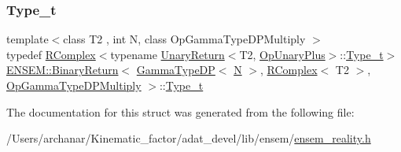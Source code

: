 \subsubsection{\texorpdfstring{Type\_t}{Type\_t}\hspace{0.1cm}{\footnotesize\ttfamily [2/2]}}
{\footnotesize\ttfamily template$<$class T2 , int N, class Op\+Gamma\+Type\+D\+P\+Multiply $>$ \\
typedef \mbox{\hyperlink{classENSEM_1_1RComplex}{R\+Complex}}$<$typename \mbox{\hyperlink{structENSEM_1_1UnaryReturn}{Unary\+Return}}$<$T2, \mbox{\hyperlink{structENSEM_1_1OpUnaryPlus}{Op\+Unary\+Plus}}$>$\+::\mbox{\hyperlink{structENSEM_1_1BinaryReturn_3_01GammaTypeDP_3_01N_01_4_00_01RComplex_3_01T2_01_4_00_01OpGammaTypeDPMultiply_01_4_a7e6760cdc5301aa79d46345dc1f653fe}{Type\+\_\+t}}$>$ \mbox{\hyperlink{structENSEM_1_1BinaryReturn}{E\+N\+S\+E\+M\+::\+Binary\+Return}}$<$ \mbox{\hyperlink{classENSEM_1_1GammaTypeDP}{Gamma\+Type\+DP}}$<$ \mbox{\hyperlink{operator__name__util_8cc_a7722c8ecbb62d99aee7ce68b1752f337}{N}} $>$, \mbox{\hyperlink{classENSEM_1_1RComplex}{R\+Complex}}$<$ T2 $>$, \mbox{\hyperlink{structENSEM_1_1OpGammaTypeDPMultiply}{Op\+Gamma\+Type\+D\+P\+Multiply}} $>$\+::\mbox{\hyperlink{structENSEM_1_1BinaryReturn_3_01GammaTypeDP_3_01N_01_4_00_01RComplex_3_01T2_01_4_00_01OpGammaTypeDPMultiply_01_4_a7e6760cdc5301aa79d46345dc1f653fe}{Type\+\_\+t}}}



The documentation for this struct was generated from the following file\+:\begin{DoxyCompactItemize}
\item 
/\+Users/archanar/\+Kinematic\+\_\+factor/adat\+\_\+devel/lib/ensem/\mbox{\hyperlink{lib_2ensem_2ensem__reality_8h}{ensem\+\_\+reality.\+h}}\end{DoxyCompactItemize}
